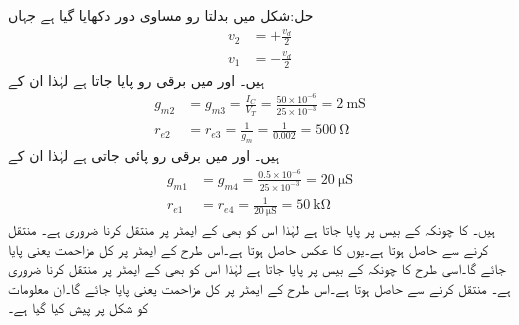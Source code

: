 حل:شکل  میں بدلتا رو مساوی دور دکھایا گیا ہے جہاں
\begin{align*}
v_2&=+\frac{v_d}{2}\\
v_1&=-\frac{v_d}{2}
\end{align*}
ہیں۔ اور   میں  برقی رو پایا جاتا ہے لہٰذا ان کے
\begin{align*}
g_{m2}&=g_{m3}=\frac{I_C}{V_T}=\frac{50 \times 10^{-6}}{25 \times 10^{-3}}=\SI{2}{\milli \siemens}\\
r_{e2}&=r_{e3} = \frac{1}{g_m}=\frac{1}{0.002}=\SI{500}{\ohm}
\end{align*}
ہیں۔ اور  میں  برقی رو پائی جاتی ہے لہٰذا ان کے
\begin{align*}
g_{m1}&=g_{m4}=\frac{0.5 \times 10^{-6}}{25 \times 10^{-3}}=\SI{20}{\micro \siemens}\\
r_{e1}&=r_{e4}=\frac{1}{\SI{20}{\micro \siemens}}=\SI{50}{\kilo \ohm}
\end{align*}
ہیں۔ کا  چونکہ  کے بیس پر پایا جاتا ہے لہٰذا اس کو بھی   کے ایمٹر پر منتقل کرنا ضروری ہے۔ منتقل کرنے سے  حاصل ہوتا ہے۔یوں  کا عکس  حاصل ہوتا ہے۔اس طرح   کے ایمٹر پر کل مزاحمت  یعنی   پایا جائے گا۔اسی طرح  کا  چونکہ  کے بیس پر پایا جاتا ہے لہٰذا اس کو بھی   کے ایمٹر پر منتقل کرنا ضروری ہے۔ منتقل کرنے سے  حاصل ہوتا ہے۔اس طرح   کے ایمٹر پر کل مزاحمت  یعنی   پایا جائے گا۔ان معلومات کو شکل  پر پیش کیا گیا ہے۔

